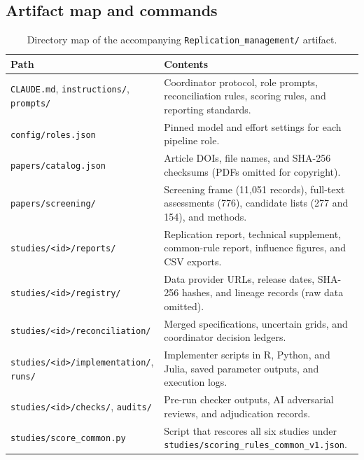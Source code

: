 \documentclass[11pt]{article}
\newcommand{\artifact}[1]{\nolinkurl{#1}}
\begin{document}
\subsection{Artifact map and commands}
\begin{table}[H]\centering\small
\begin{tabularx}{\linewidth}{@{}p{.40\linewidth}Y@{}}\toprule
Path & Contents\\\midrule
\artifact{CLAUDE.md}, \artifact{instructions/}, \artifact{prompts/} & Coordinator protocol, role prompts, reconciliation rules, scoring rules, and reporting standards.\\
\artifact{config/roles.json} & Pinned model and effort settings for each pipeline role.\\
\artifact{papers/catalog.json} & Article DOIs, file names, and SHA-256 checksums (PDFs omitted for copyright).\\
\artifact{papers/screening/} & Screening frame (11,051 records), full-text assessments (776), candidate lists (277 and 154), and methods.\\
\artifact{studies/<id>/reports/} & Replication report, technical supplement, common-rule report, influence figures, and CSV exports.\\
\artifact{studies/<id>/registry/} & Data provider URLs, release dates, SHA-256 hashes, and lineage records (raw data omitted).\\
\artifact{studies/<id>/reconciliation/} & Merged specifications, uncertain grids, and coordinator decision ledgers.\\
\artifact{studies/<id>/implementation/}, \artifact{runs/} & Implementer scripts in R, Python, and Julia, saved parameter outputs, and execution logs.\\
\artifact{studies/<id>/checks/}, \artifact{audits/} & Pre-run checker outputs, AI adversarial reviews, and adjudication records.\\
\artifact{studies/score_common.py} & Script that rescores all six studies under \artifact{studies/scoring_rules_common_v1.json}.\\\bottomrule
\end{tabularx}\caption{Directory map of the accompanying \artifact{Replication_management/} artifact.}\label{tab:artifact-map}\end{table}
\end{document}
